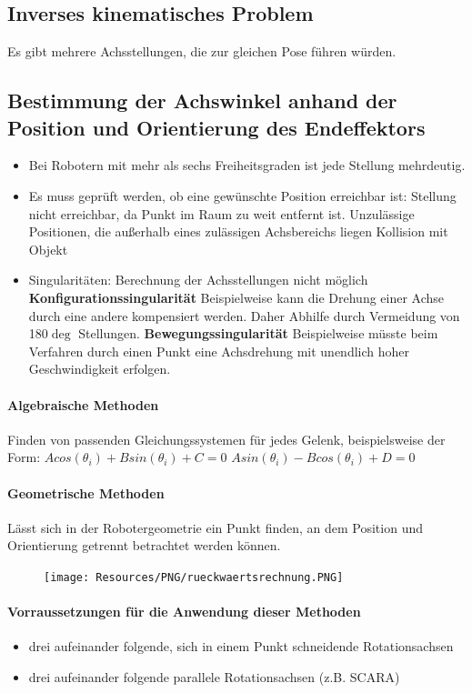 \subsection{Inverses kinematisches Problem}
Es gibt mehrere Achsstellungen, die zur gleichen Pose führen würden.
\subsection{Bestimmung der Achswinkel anhand der Position und Orientierung des Endeffektors}
\begin{itemize}
	\item Bei Robotern mit mehr als sechs Freiheitsgraden ist jede Stellung mehrdeutig.
	\item Es muss geprüft werden, ob eine gewünschte Position erreichbar ist:
	\subitem Stellung nicht erreichbar, da Punkt im Raum zu weit entfernt ist.
	\subitem Unzulässige Positionen, die außerhalb eines zulässigen Achsbereichs liegen
	\subitem Kollision mit Objekt
	\item Singularitäten: Berechnung der Achsstellungen nicht möglich
	\subitem \textbf{Konfigurationssingularität} Beispielweise kann die Drehung einer Achse durch eine andere kompensiert werden.
	Daher Abhilfe durch Vermeidung von 180$\deg$ Stellungen.
	\subitem \textbf{Bewegungssingularität} Beispielweise müsste beim Verfahren durch einen Punkt eine Achsdrehung mit unendlich hoher Geschwindigkeit erfolgen.
\end{itemize}
\paragraph{Algebraische Methoden}
Finden von passenden Gleichungssystemen für jedes Gelenk, beispielsweise der Form:
	$A cos(\theta_i) + B sin(\theta_i) + C = 0$
	$A sin(\theta_i) - B cos(\theta_i) + D = 0$
\paragraph{Geometrische Methoden}
Lässt sich in der Robotergeometrie ein Punkt finden, an dem Position und Orientierung getrennt betrachtet werden können.
\begin{figure}[H]
	\begin{center}
		\texttt{[image: Resources/PNG/rueckwaertsrechnung.PNG]}
		\caption{}
		\label{fig:PNG/rueckwaertsrechnung.PNG}
	\end{center}
\end{figure}
\paragraph{Vorraussetzungen für die Anwendung dieser Methoden}
\begin{itemize}
	\item drei aufeinander folgende, sich in einem Punkt schneidende Rotationsachsen
	\item drei aufeinander folgende parallele Rotationsachsen (z.B. SCARA)
\end{itemize}
